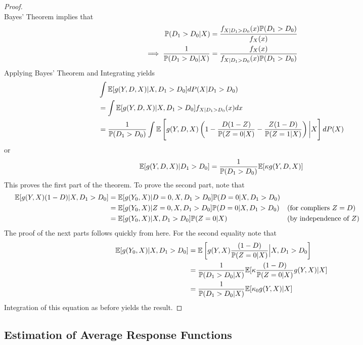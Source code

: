 \begin{proof}
\begin{equation*}
	\end{equation*}
	Bayes' Theorem implies that 
	\begin{equation*}
		\begin{split}
			\P(D_1 > D_0 | X) &= \frac{f_{X|D_1>D_0}(x)\P(D_1 > D_0)}{f_X(x)} \\
			\implies \frac{1}{\P(D_1 > D_0 | X)} &= \frac{f_X(x)}{f_{X|D_1>D_0}(x)\P(D_1 > D_0)}
		\end{split}
	\end{equation*}
	Applying Bayes' Theorem and Integrating yields
	\begin{equation*}
		\begin{split}
			&\int \E[g(Y,D,X) | X, D_1 > D_0] dP(X|D_1 > D_0) \\
			&= \int  \E[g(Y,D,X) | X, D_1 > D_0] f_{X | D_1 > D_0}(x)dx\\
			&= \frac{1}{\P(D_1 > D_0)} \int \E\left[g(Y,D,X)\left(1 - \frac{D(1-Z)}{\P(Z=0|X)} - \frac{Z(1-D)}{\P(Z=1|X)}\right)\bigg| X\right] dP(X)
		\end{split}
	\end{equation*}
	or 
	\begin{equation*}
		\E[g(Y,D,X)|D_1 > D_0] = \frac{1}{\P(D_1 > D_0)}\E[\kappa g(Y,D,X)]
	\end{equation*}
	This proves the first part of the theorem. To prove the second part, note that 
	\begin{align*}
		\E[g(Y,X)(1-D)|X, D_1 > D_0] &= \E[g(Y_0, X)|D=0, X, D_1 > D_0]\P(D=0|X, D_1 > D_0) & \\ 
									 &= \E[g(Y_0, X)|Z=0, X, D_1 > D_0]\P(D=0|X,D_1 > D_0)  &\parbox[t]{20em}{(for compliers $Z = D$)} \\
									 &= \E[g(Y_0, X)|X,D_1 > D_0]\P(Z=0|X) &\parbox[t]{20em}{(by independence of $Z$)}
	\end{align*}
	The proof of the next parts follows quickly from here. For the second equality note that 
	\begin{align*}
		\E[g(Y_0, X) | X, D_1 > D_0] &= \E\left[g(Y,X)\frac{(1-D)}{\P(Z= 0|X)}\Big| X, D_1 > D_0\right] \\ 
									 &= \frac{1}{\P(D_1 > D_0 |X)}\E[\kappa\frac{(1-D)}{\P(Z=0|X)}g(Y,X) | X] \\ 
									 &= \frac{1}{\P(D_1 > D_0 |X)}\E[\kappa_0 g(Y,X)|X]
	\end{align*}
	Integration of this equation as before yields the result.
\end{proof}

\subsection{Estimation of Average Response Functions}

